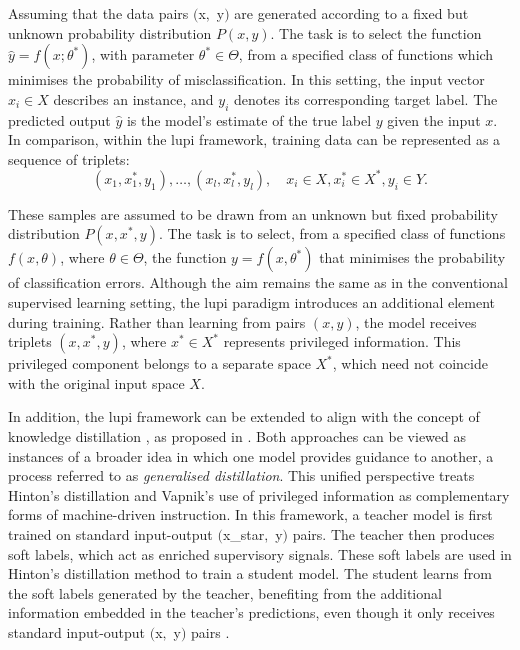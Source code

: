\noindent Assuming that the data pairs $($\gls{x}$ ,$ \gls{y}$)$ are generated according to a fixed but unknown probability distribution \(P(x, y)\). The task is to select the function \(\hat{y} = f(x; \theta^{*})\), with parameter \(\theta^{*} \in \Theta\), from a specified class of functions which minimises the probability of misclassification. In this setting, the input vector \(x_i \in X\) describes an instance, and \(y_i\) denotes its corresponding target label. The predicted output \(\hat{y}\) is the model's estimate of the true label \(y\) given the input \(x\).
In comparison, within the \gls{lupi} framework, training data can be represented as a sequence of triplets:
\begin{equation} \label{eq:lupi_pairs}
(x_1, x_1^*, y_1), \dots, (x_l, x_l^*, y_l), \quad x_i \in X , x_i^* \in X^*, y_i \in Y .
\end{equation}

\noindent These samples are assumed to be drawn from an unknown but fixed probability distribution \( P(x, x^*, y) \). The task is to select, from a specified class of functions \( f(x, \theta) \), where \( \theta \in \Theta \), the function \( y = f(x, \theta^*) \) that minimises the probability of classification errors.
Although the aim remains the same as in the conventional supervised learning setting, the \gls{lupi} paradigm introduces an additional element during training. Rather than learning from pairs \( (x, y) \), the model receives triplets \( (x, x^*, y) \), where \( x^* \in X^* \) represents privileged information. This privileged component belongs to a separate space \( X^* \), which need not coincide with the original input space \( X \).

In addition, the \gls{lupi} framework can be extended to align with the concept of knowledge distillation \cite{hinton_distillation}, as proposed in \cite{lupi_distillation}. Both approaches can be viewed as instances of a broader idea in which one model provides guidance to another, a process referred to as \textit{generalised distillation}. This unified perspective treats Hinton’s distillation \cite{hinton_distillation} and Vapnik’s use of privileged information \cite{lupi} as complementary forms of machine-driven instruction.
In this framework, a teacher model is first trained on standard input-output $($\gls{x_star}$ ,$ \gls{y}$)$  pairs. The teacher then produces soft labels, which act as enriched supervisory signals. These soft labels are used in Hinton’s distillation method to train a student model. The student learns from the soft labels generated by the teacher, benefiting from the additional information embedded in the teacher’s predictions, even though it only receives standard input-output $($\gls{x}$ ,$ \gls{y}$)$  pairs \cite{lupi_distillation}.

